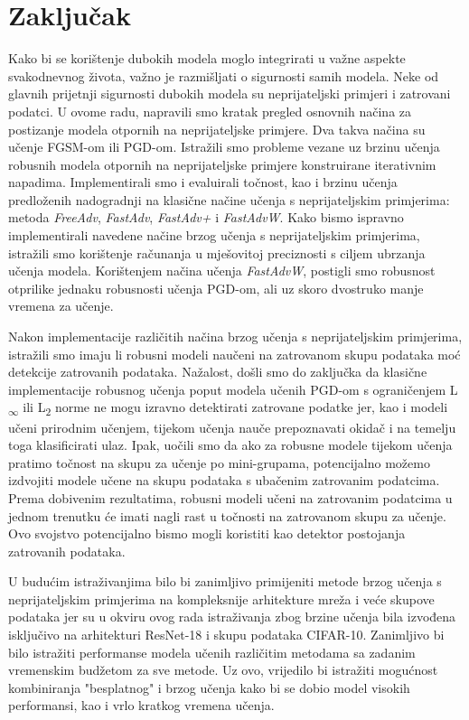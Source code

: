 \documentclass[times, utf8, zavrsni, numeric]{fer}
\begin{document}
\chapter{Zaključak}

Kako bi se korištenje dubokih modela moglo integrirati u važne aspekte svakodnevnog života, važno je razmišljati o sigurnosti samih modela. 
Neke od glavnih prijetnji sigurnosti dubokih modela su neprijateljski primjeri i zatrovani podatci.
U ovome radu, napravili smo kratak pregled osnovnih načina za postizanje modela otpornih na neprijateljske primjere. Dva takva načina su učenje FGSM-om ili PGD-om.
Istražili smo probleme vezane uz brzinu učenja robusnih modela otpornih na neprijateljske primjere konstruirane iterativnim napadima.
Implementirali smo i evaluirali točnost, kao i brzinu učenja predloženih nadogradnji na klasične načine učenja s neprijateljskim primjerima: metoda \textit{FreeAdv}, \textit{FastAdv}, \textit{FastAdv+} i \textit{FastAdvW}.
Kako bismo ispravno implementirali navedene načine brzog učenja s neprijateljskim primjerima, istražili smo korištenje računanja u mješovitoj preciznosti s ciljem ubrzanja učenja modela.
Korištenjem načina učenja \textit{FastAdvW}, postigli smo robusnost otprilike jednaku robusnosti učenja PGD-om, ali uz skoro dvostruko manje vremena za učenje.

Nakon implementacije različitih načina brzog učenja s neprijateljskim primjerima, istražili smo imaju li robusni modeli naučeni na zatrovanom skupu podataka moć detekcije zatrovanih podataka.
Nažalost, došli smo do zaključka da klasične implementacije robusnog učenja poput modela učenih PGD-om s ograničenjem L\textsubscript{$\infty$} ili L\textsubscript{2} norme ne mogu izravno detektirati zatrovane podatke jer, kao i modeli učeni prirodnim učenjem, 
tijekom učenja nauče prepoznavati okidač i na temelju toga klasificirati ulaz. 
Ipak, uočili smo da ako za robusne modele tijekom učenja pratimo točnost na skupu za učenje po mini-grupama, potencijalno možemo izdvojiti modele učene na skupu podataka s ubačenim zatrovanim podatcima.
Prema dobivenim rezultatima, robusni modeli učeni na zatrovanim podatcima u jednom trenutku će imati nagli rast u točnosti na zatrovanom skupu za učenje. Ovo svojstvo potencijalno bismo mogli koristiti kao detektor postojanja zatrovanih podataka.

\pagebreak

U budućim istraživanjima bilo bi zanimljivo primijeniti metode brzog učenja s neprijateljskim primjerima na kompleksnije arhitekture mreža i veće skupove podataka 
jer su u okviru ovog rada istraživanja zbog brzine učenja bila izvođena isključivo na arhitekturi ResNet-18 i skupu podataka CIFAR-10. 
Zanimljivo bi bilo istražiti performanse modela učenih različitim metodama sa zadanim vremenskim budžetom za sve metode.
Uz ovo, vrijedilo bi istražiti mogućnost kombiniranja "besplatnog" i brzog učenja kako bi se dobio model visokih performansi, kao i vrlo kratkog vremena učenja. 
\end{document}
